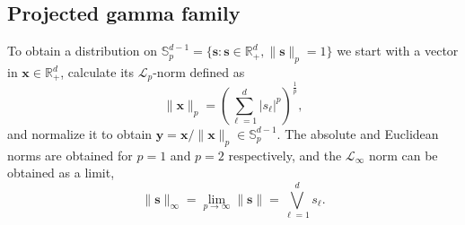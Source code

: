 \subsection{Projected gamma family\label{subsec:projgamma}}
To obtain a distribution on 
${\mathbb S}_{p}^{d-1}=\{\bm{s} : \bm{s} \in {\mathbb R}_{+}^{d}, \| \bm{s}\|_{p} = 1\}$ 
we start with a vector in 
$\bm{x} \in {\mathbb R}^d_+$, calculate its $\mathcal{L}_p$-norm  defined as
  \begin{equation*}
    \lVert \bm{x} \rVert_p = 
    \left({\textstyle\sum}_{\ell = 1}^d \lvert s_{\ell}\rvert^p\right)^{\frac{1}{p}},
  \end{equation*}
  and normalize it to obtain $\bm{y} = \bm{x}/\|\bm{x}\|_p \in {\mathbb S}_p^{d-1}$. 
  The absolute and Euclidean norms are obtained for $p=1$ and $p=2$ respectively,
  and the $\mathcal{L}_{\infty}$ norm can be obtained as a limit, 
  \begin{equation*}
    \| \bm{s} \|_{\infty}
      = \lim\limits_{p\to\infty} \| \bm{s} \|
      = \underset{\ell = 1}{\overset{d}{\bigvee}}s_{\ell}.
  \end{equation*}

